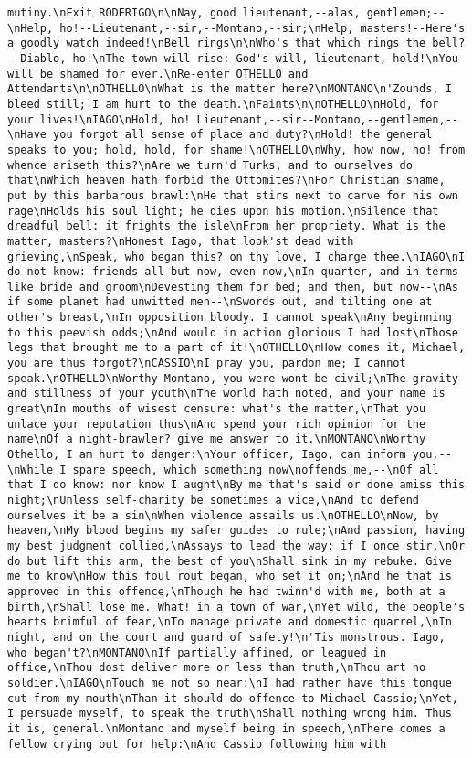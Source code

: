 \begin{verbatim}
mutiny.\nExit RODERIGO\n\nNay, good lieutenant,--alas, gentlemen;--\nHelp, ho!--Lieutenant,--sir,--Montano,--sir;\nHelp, masters!--Here's a goodly watch indeed!\nBell rings\n\nWho's that which rings the bell?--Diablo, ho!\nThe town will rise: God's will, lieutenant, hold!\nYou will be shamed for ever.\nRe-enter OTHELLO and Attendants\n\nOTHELLO\nWhat is the matter here?\nMONTANO\n'Zounds, I bleed still; I am hurt to the death.\nFaints\n\nOTHELLO\nHold, for your lives!\nIAGO\nHold, ho! Lieutenant,--sir--Montano,--gentlemen,--\nHave you forgot all sense of place and duty?\nHold! the general speaks to you; hold, hold, for shame!\nOTHELLO\nWhy, how now, ho! from whence ariseth this?\nAre we turn'd Turks, and to ourselves do that\nWhich heaven hath forbid the Ottomites?\nFor Christian shame, put by this barbarous brawl:\nHe that stirs next to carve for his own rage\nHolds his soul light; he dies upon his motion.\nSilence that dreadful bell: it frights the isle\nFrom her propriety. What is the matter, masters?\nHonest Iago, that look'st dead with grieving,\nSpeak, who began this? on thy love, I charge thee.\nIAGO\nI do not know: friends all but now, even now,\nIn quarter, and in terms like bride and groom\nDevesting them for bed; and then, but now--\nAs if some planet had unwitted men--\nSwords out, and tilting one at other's breast,\nIn opposition bloody. I cannot speak\nAny beginning to this peevish odds;\nAnd would in action glorious I had lost\nThose legs that brought me to a part of it!\nOTHELLO\nHow comes it, Michael, you are thus forgot?\nCASSIO\nI pray you, pardon me; I cannot speak.\nOTHELLO\nWorthy Montano, you were wont be civil;\nThe gravity and stillness of your youth\nThe world hath noted, and your name is great\nIn mouths of wisest censure: what's the matter,\nThat you unlace your reputation thus\nAnd spend your rich opinion for the name\nOf a night-brawler? give me answer to it.\nMONTANO\nWorthy Othello, I am hurt to danger:\nYour officer, Iago, can inform you,--\nWhile I spare speech, which something now\noffends me,--\nOf all that I do know: nor know I aught\nBy me that's said or done amiss this night;\nUnless self-charity be sometimes a vice,\nAnd to defend ourselves it be a sin\nWhen violence assails us.\nOTHELLO\nNow, by heaven,\nMy blood begins my safer guides to rule;\nAnd passion, having my best judgment collied,\nAssays to lead the way: if I once stir,\nOr do but lift this arm, the best of you\nShall sink in my rebuke. Give me to know\nHow this foul rout began, who set it on;\nAnd he that is approved in this offence,\nThough he had twinn'd with me, both at a birth,\nShall lose me. What! in a town of war,\nYet wild, the people's hearts brimful of fear,\nTo manage private and domestic quarrel,\nIn night, and on the court and guard of safety!\n'Tis monstrous. Iago, who began't?\nMONTANO\nIf partially affined, or leagued in office,\nThou dost deliver more or less than truth,\nThou art no soldier.\nIAGO\nTouch me not so near:\nI had rather have this tongue cut from my mouth\nThan it should do offence to Michael Cassio;\nYet, I persuade myself, to speak the truth\nShall nothing wrong him. Thus it is, general.\nMontano and myself being in speech,\nThere comes a fellow crying out for help:\nAnd Cassio following him with 
\end{verbatim}
